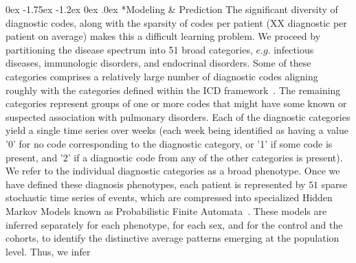 \documentclass[onecolumn, compsoc,11pt]{IEEEtran}
\makeatletter
\renewcommand\subsection{\@startsection {subsection}{2}{\z@}%
                                   {0ex \@plus -1.75ex \@minus -1.2ex}%
                                   {0ex \@plus.0ex}%
                                   {\fontsize{11}{11}\selectfont\bfseries\sffamily\color{black}}}
\def\avgNumDX{XX\xspace}%
\def\DXphn{51}%
\def\RXphn{18}%
\makeatother
\begin{document}
\subsection*{Modeling \& Prediction}
The significant diversity of diagnostic codes, along with the sparsity of codes per patient (\avgNumDX diagnostic per patient on average)   makes this a difficult learning problem. %
We proceed by  partitioning the  disease spectrum into \DXphn\xspace broad  categories, $e.g.$ infectious diseases, immunologic disorders, and endocrinal disorders. Some of these categories comprises a relatively large number of diagnostic codes aligning roughly with the  categories defined within the ICD framework~\cite{world1988international}. The remaining categories represent groups of one or more codes that
might have some known or suspected association with pulmonary
disorders.  Each of the diagnostic categories yield a single time series over weeks (each week being identified as having a value '0' for no code corresponding to the diagnostic category, or  '1' if some code is present, and '2' if a diagnostic code from any of the other categories is present). 
We refer to the individual diagnostic categories  as a broad phenotype.  Once we have defined  these diagnosis phenotypes, each patient is  represented by $\DXphn$  sparse  stochastic time series of  events, which  are  compressed into specialized Hidden Markov Models known as Probabilistic Finite Automata~\cite{CL12g,Chattopadhyay20140826}. These models are inferred separately for each phenotype,  for each sex, and for the control and the \treatment cohorts,  to identify  the distinctive average patterns  emerging at the population level. Thus, we infer 
\end{document}
